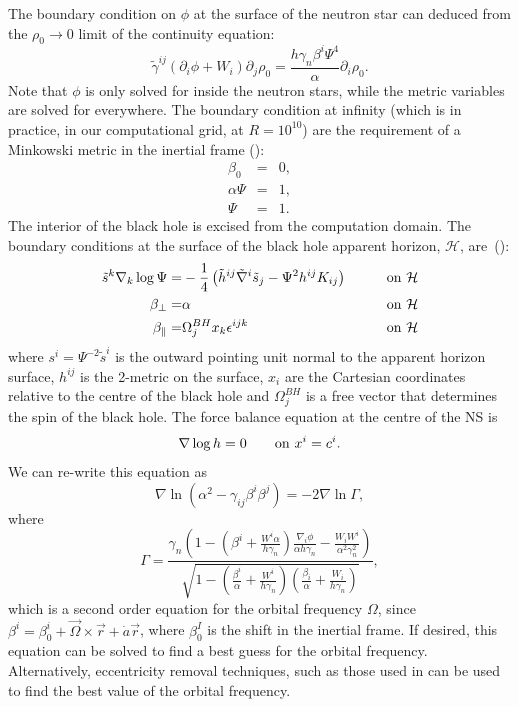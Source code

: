The boundary condition on $\phi$ at the surface of the neutron star can deduced from the $\rho_0\rightarrow 0$ limit of the continuity equation:
\begin{equation}
\tilde{\gamma}^{ij}\left(\partial_i\phi+W_i\right)\partial_j\rho_0=\frac{h\gamma_n\beta^i\Psi^4}{\alpha}\partial_i\rho_0.
\end{equation}
Note that $\phi$ is only solved for inside the neutron stars, while
the metric variables are solved for everywhere.
The boundary condition at infinity (which is in practice, in our
computational grid, at $R=10^{10}$) are the requirement of a Minkowski
metric in the inertial frame (\cite{FoucartEtAl:2008}):
\begin{eqnarray}
\beta_0&=&0,\\
\alpha\Psi &=& 1,\\
\Psi &=&1.
\end{eqnarray}
The interior of the black hole is excised from the computation
domain. The boundary conditions at the surface of the black hole
apparent horizon, $\mathcal{H}$, are~(\cite{Cook2004}):
\begin{align}
\tilde{s}^k\nabla_k\log\Psi=&-\frac{1}{4}\left(\tilde{h}^{ij}\tilde{\nabla}^i\tilde{s}_j-\Psi^2h^{ij}K_{ij}\right)
\qquad &{\rm on} ~\mathcal{H} \label{eq:BhBoundary}\\
\beta_{\perp}=&\alpha &{\rm on} ~\mathcal{H} \label{eq:BhBoundary2} \\
\beta_{\parallel}=&\Omega_{j}^{BH}x_k\epsilon^{ijk}
&{\rm on}
~\mathcal{H} \label{eq:BhBoundary3}
\end{align}
where $s^i=\Psi^{-2}\tilde{s}^i$ is the outward pointing unit normal to the apparent horizon
surface, $h^{ij}$ is the 2-metric on the surface, $x_i$ are the
Cartesian coordinates relative to the centre of the black hole and $\Omega_j^{BH}$ is a
free vector that determines the spin of the black hole.
The force balance equation at the centre of the NS is 
\begin{equation}
\nabla\log h=0 \qquad {\rm on}~x^i=c^i.
\end{equation}
We can re-write this equation as 
 \begin{equation}
\label{eq:OmegaDriver}
\nabla\ln\left(\alpha^2-\gamma_{ij}\beta^{i}\beta^{j}\right)=-2\nabla\ln\Gamma,
\end{equation}
where
\begin{equation}
\Gamma
=\frac{\gamma_n\left(1-\left(\beta^i+\frac{W^i\alpha}{h\gamma_n}\right)\frac{\nabla_i\phi}{\alpha
    h\gamma_n}- \frac{W_i W^i}{\alpha^2\gamma_n^2}\right) } { \sqrt{ 1
    - \left(\frac{\beta^i}{\alpha}+\frac{W^i}{h\gamma_n}\right)
    \left(\frac{\beta_i}{\alpha}+\frac{W_i}{h\gamma_n}\right) } } ,
\end{equation}
which is a second order equation for the orbital
frequency $\Omega$, since $\beta^i=\beta^i_0 +
\vec{\Omega}\times\vec{r} + \dot{a}\vec{r}$, where $\beta^I_0$ is the
shift in the inertial frame. If desired, this equation can be solved to find a
best guess for the orbital frequency. Alternatively, eccentricity
removal techniques, such as those used in \cite{Tacik:2015tja} can be
used to find the best value of the orbital frequency.


